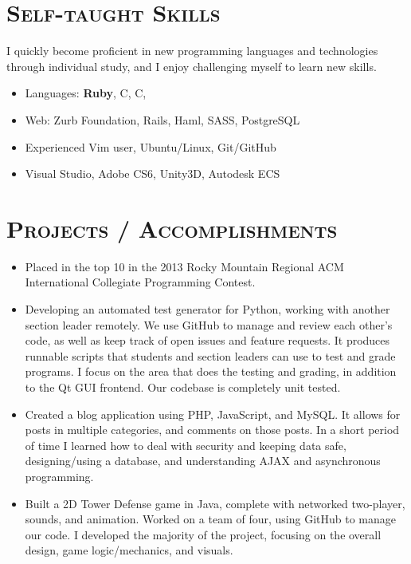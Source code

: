 \documentclass[11pt,letterpaper]{article}
\newcommand{\CPP}
{C\nolinebreak[4]\hspace{-.05em}\raisebox{.22ex}{\footnotesize\bf ++}}
\newcommand{\CS}
{C\nolinebreak[4]\hspace{-.05em}\raisebox{.22ex}{\footnotesize\bf \#}}
\begin{document}
\begin{minipage}{\textwidth}
\section{\scshape Self-taught Skills}
\vspace{-3mm}
I quickly become proficient in new programming languages and technologies through individual study,
and I enjoy challenging myself to learn new skills.
\vspace{2mm}
\begin{itemize}
 \item Languages: {\bfseries Ruby}, \CPP, \CS, \textls{\LaTeX}
 \item Web: Zurb Foundation, Rails, Haml, SASS, PostgreSQL
 \item Experienced Vim user, Ubuntu/Linux, Git/GitHub
 \item Visual Studio, Adobe CS6, Unity3D, Autodesk ECS
\end{itemize}

\vspace{-3mm}
\section{\scshape Projects / Accomplishments}
\vspace{-3mm}

\begin{itemize}
 \item Placed in the top 10 in the 2013 Rocky Mountain Regional ACM International Collegiate Programming Contest.
 \item Developing an automated test generator for Python, working with another section leader remotely. We use GitHub to
 manage and review each other's code, as well as keep track of open issues and feature requests. It produces runnable
 scripts that students and section leaders can use to test and grade programs. I focus on the
 area that does the testing and grading, in addition to the Qt GUI frontend. Our codebase is
 completely unit tested.
 \item Created a blog application using PHP, JavaScript, and MySQL. It allows for posts in
 multiple categories, and comments on those posts. In a short period of time I learned how to deal with
 security and keeping data safe, designing/using a database, and understanding AJAX and asynchronous programming.
 \item Built a 2D Tower Defense game in Java, complete with networked two-player, sounds, and animation. Worked on 
 a team of four, using GitHub to manage our code. I developed the majority of the project, focusing on the
 overall design, game logic/mechanics, and visuals.
\end{itemize}



\end{minipage}
\end{document}
